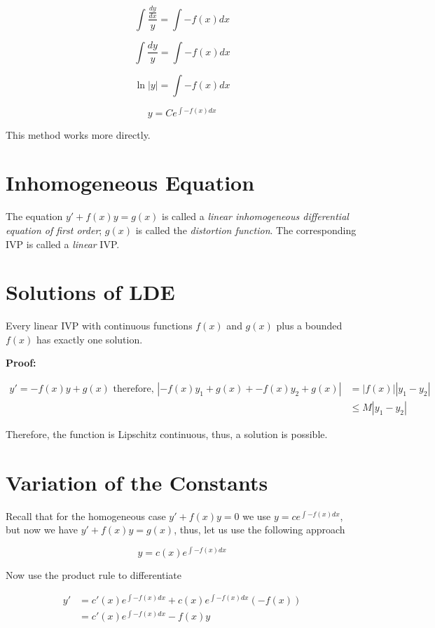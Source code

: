\[
    \int \frac{\frac{dy}{dx}}{y} = \int -f(x) dx
\]

\[
    \int \frac{dy}{y} = \int -f(x) dx
\]

\[
    \ln|y| = \int -f(x) dx
\]

\[
    y = C e^{\int -f(x) dx}
\]

This method works more directly.

\section{Inhomogeneous Equation}

The equation \(y' + f(x)y = g(x)\) is called a \emph{linear inhomogeneous differential equation
    of first order}; \(g(x)\) is called the \emph{distortion function}. The corresponding IVP is called
a \emph{linear} IVP\@.

\section{Solutions of LDE}

Every linear IVP with continuous functions \(f(x)\) and \(g(x)\) plus a bounded \(f(x)\)
has exactly one solution.

\textbf{Proof:}

\begin{align*}
    y' = -f(x)y + g(x) \text{ therefore, } |-f(x)y_1 + g(x) + -f(x)y_2 + g(x) | & = |f(x)||y_1 - y_2| \\
                                                                                & \le M |y_1 - y_2|
\end{align*}

Therefore, the function is Lipschitz continuous, thus, a solution is possible.

\QED

\section{Variation of the Constants}

Recall that for the homogeneous case \(y' + f(x)y = 0\) we use
\(y = c e^{\int -f(x) dx}\), but now we have \(y' + f(x)y = g(x)\), thus, let us use the following
approach

\[
    y = c(x) e^{\int -f(x) dx}
\]

Now use the product rule to differentiate

\begin{align*}
    y' & = c'(x) e^{\int -f(x) dx} + c(x)e^{\int -f(x) dx}(-f(x)) \\
       & = c'(x)e^{\int -f(x) dx} - f(x)y
\end{align*}

